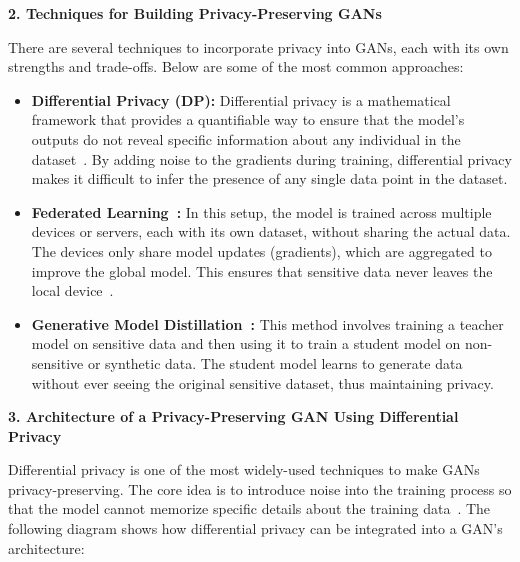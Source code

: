 \textbf{2. Techniques for Building Privacy-Preserving GANs}

There are several techniques to incorporate privacy into GANs, each with its own strengths and trade-offs. Below are some of the most common approaches:

\begin{itemize}
    \item \textbf{Differential Privacy (DP):} Differential privacy is a mathematical framework that provides a quantifiable way to ensure that the model's outputs do not reveal specific information about any individual in the dataset~\cite{liu2021subverting}. By adding noise to the gradients during training, differential privacy makes it difficult to infer the presence of any single data point in the dataset.
    \item \textbf{Federated Learning~\cite{mcmahan2017communication}:} In this setup, the model is trained across multiple devices or servers, each with its own dataset, without sharing the actual data. The devices only share model updates (gradients), which are aggregated to improve the global model. This ensures that sensitive data never leaves the local device~\cite{zhang2021survey}.
    \item \textbf{Generative Model Distillation~\cite{salimans2022progressive}:} This method involves training a teacher model on sensitive data and then using it to train a student model on non-sensitive or synthetic data. The student model learns to generate data without ever seeing the original sensitive dataset, thus maintaining privacy.
\end{itemize}

\textbf{3. Architecture of a Privacy-Preserving GAN Using Differential Privacy}

Differential privacy is one of the most widely-used techniques to make GANs privacy-preserving. The core idea is to introduce noise into the training process so that the model cannot memorize specific details about the training data~\cite{wu2019privacy}. The following diagram shows how differential privacy can be integrated into a GAN's architecture:

\begin{center}
\end{center}


